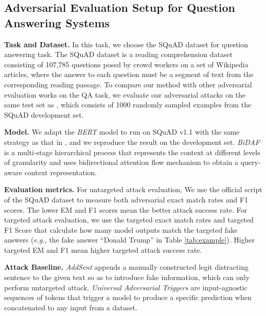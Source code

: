 \subsection{Adversarial Evaluation Setup for Question Answering Systems}
\textbf{Task and Dataset.} In this task, we choose the SQuAD dataset \citep{rajpurkar-etal-2016-squad} for question answering task. The SQuAD dataset is a reading comprehension dataset consisting of 107,785 questions posed by crowd workers on a set of Wikipedia articles, where the answer to each question must be a segment of text from the corresponding reading passage. To compare our method with other adversarial evaluation works \citep{jia-liang-2017-adversarial} on the QA task, we evaluate our adversarial attacks on the same test set as \citet{jia-liang-2017-adversarial}, which consists of 1000 randomly sampled examples from the SQuAD development set. 

\textbf{Model.} We adapt the \emph{BERT} model to run on SQuAD v1.1 with the same strategy as that in \citet{Devlin2019BERTPO}, and we reproduce the result on the development set. \textit{BiDAF}\citep{seo2016-bidirectional} is a multi-stage hierarchical process that represents the context at different levels of granularity and uses bidirectional attention flow mechanism to obtain a query-aware context representation. 

\textbf{Evaluation metrics.} For untargeted attack evaluation, We use the official script of the SQuAD dataset \citep{rajpurkar-etal-2016-squad} to measure both adversarial exact match rates and F1 scores. The lower EM and F1 scores mean the better attack success rate. For targeted attack evaluation, we use the targeted exact match rates and targeted F1 Score that calculate how many model outputs match the targeted fake answers (\textit{e.g.}, the fake answer ``Donald Trump'' in Table \ref{tab:example}). Higher targeted EM and F1 mean higher targeted attack success rate. 

 
\textbf{Attack Baseline.}  \emph{AddSent} \citep{jia-liang-2017-adversarial} appends a manually constructed legit distracting sentence to the given text so as to introduce fake information, which can only perform untargeted attack. \emph{Universal Adversarial Triggers} \citep{wallace-etal-2019-universal} are input-agnostic sequences of tokens that trigger a model to produce a specific prediction when concatenated to any input from a dataset.  %
 

